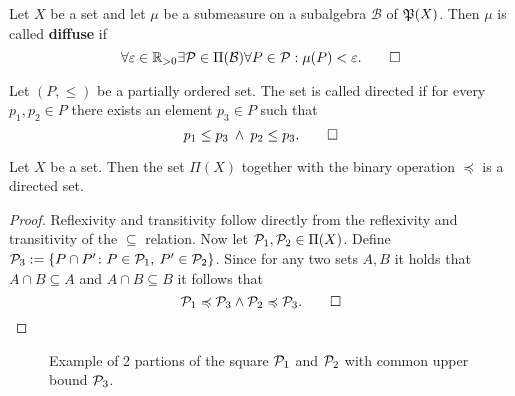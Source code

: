 \begin{defin}
  Let $X$ be a set and let $\mu$ be a submeasure on a subalgebra $\mathcal{B}$ of $\PowS(X)$. Then $\mu$ is called \textbf{diffuse} if
  \begin{equation*}
    \forall \varepsilon\in \R_{>0}\exists \P \in \Pi(\mathcal{B})\forall P \in \P: \mu(P) < \varepsilon.\qedhere
  \end{equation*}
\end{defin}

\begin{defin}
  Let $(P, \leq)$ be a partially ordered set. The set is called directed if for every $p_1, p_2 \in P$ there exists an element $p_3 \in P$ such that
  \begin{equation*}
    p_1 \leq p_3 \: \land \: p_2 \leq p_3.\qedhere
  \end{equation*}
\end{defin}

\begin{thm}\label{thm:algdirected}
  Let $X$ be a set. Then the set $\Pi(X)$ together with the binary operation $\preccurlyeq$ is a directed set.
\end{thm}

\begin{proof}
  Reflexivity and transitivity follow directly from the reflexivity and transitivity of the $\subseteq$ relation.
  Now let $\P_1, \P_2 \in \Pi(X)$. Define $\P_3 := \{ P \cap P' \colon P \in \P_1, \:P' \in \P_2 \}$.
  Since for any two sets $A, B$ it holds that $A \cap B \subseteq A$ and $A \cap B \subseteq B$ it follows that
  \begin{equation*}
    \P_1 \preccurlyeq \P_3 \land \P_2 \preccurlyeq \P_3.\qedhere
  \end{equation*}
\end{proof}

\begin{figure}[ht!]
  \centering
  \caption{Example of 2 partions of the square $\P_1$ and $\P_2$ with common upper bound $\P_3$.}
\end{figure}

